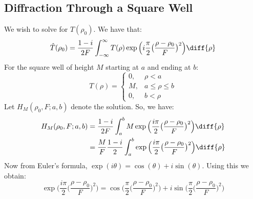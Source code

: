 \documentclass[crop=false,class=book,oneside]{standalone}
\begin{document}
        \subsection{Diffraction Through a Square Well}
            \label{Subsec:Cassini_Math_Diffraction_%
                   Through_a_Square_well}
            We wish to solve for $\hat{T}(\rho_{0})$. We have that:
            \begin{equation*}
                \hat{T}(\rho_{0})
                =\frac{1-i}{2F}
                    \int_{-\infty}^{\infty}T(\rho)
                    \exp\Big(i\frac{\pi}{2}
                        \big(\frac{\rho-\rho_{0}}{F}\big)^{2}\Big)
                    \diff{\rho}
            \end{equation*}
            For the square well of height $M$
            starting at $a$ and ending at $b$:
            \begin{equation*}
                T(\rho)=
                \begin{cases}
                    0,&\rho<a\\
                    M,&a\leq\rho\leq{b}\\
                    0,&b<\rho
                \end{cases}
            \end{equation*}
            Let $H_{M}(\rho_0,F;a,b)$ denote the solution.
            So, we have:
            \begin{align}
                H_{M}(\rho_0,F;a,b)
                &=\frac{1-i}{2F}\int_{a}^{b}M
                    \exp\Big(
                        \frac{i\pi}{2}
                        \big(
                            \frac{\rho-\rho_{0}}{F}
                        \big)^{2}
                    \Big)\diff{\rho}\\
                &=\frac{M}{F}\frac{1-i}{2}
                    \int_{a}^{b}
                    \exp\Big(
                        \frac{i\pi}{2}
                        \big(
                            \frac{\rho-\rho_{0}}{F}
                        \big)^{2}
                    \Big)\diff{\rho}
            \end{align}
            Now from Euler's formula,
            $\exp(i\theta)=\cos(\theta)+i\sin(\theta).$
            Using this we obtain:
            \begin{equation}
                \exp\Big(
                    \frac{i\pi}{2}
                    \big(
                        \frac{\rho-\rho_{0}}{F}
                    \big)^{2}
                \Big)
                =\cos\Big(
                    \frac{\pi}{2}
                    \big(\frac{\rho-\rho_{0}}{F}\big)^{2}
                \Big)+
                i\sin\Big(
                    \frac{\pi}{2}
                    \big(\frac{\rho-\rho_{0}}{F}\big)^{2}
                \Big)
            \end{equation}
\end{document}
